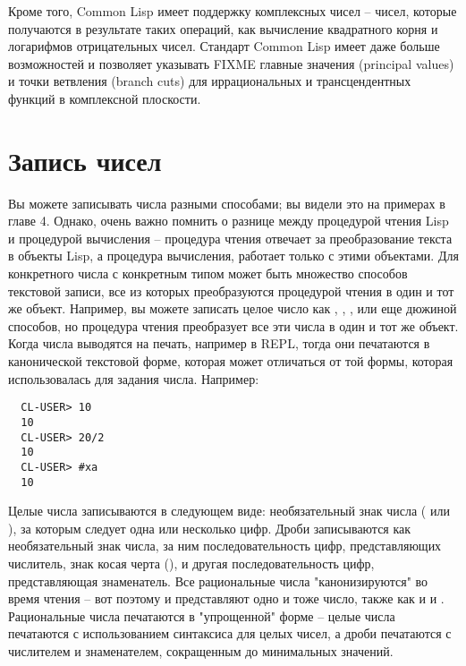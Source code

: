 Кроме того, Common Lisp имеет поддержку комплексных чисел -- чисел, которые получаются в
результате таких операций, как вычисление квадратного корня и логарифмов отрицательных
чисел. Стандарт Common Lisp имеет даже больше возможностей и позволяет указывать FIXME
главные значения (principal values) и точки ветвления (branch cuts) для иррациональных и
трансцендентных функций в комплексной плоскости.

\section{Запись чисел}

Вы можете записывать числа разными способами; вы видели это на примерах в главе 4.
Однако, очень важно помнить о разнице между процедурой чтения Lisp и процедурой вычисления
-- процедура чтения отвечает за преобразование текста в объекты Lisp, а процедура
вычисления, работает только с этими объектами.  Для конкретного числа с конкретным типом
может быть множество способов текстовой записи, все из которых преобразуются процедурой
чтения в один и тот же объект.  Например, вы можете записать целое число  как
, , , или еще дюжиной способов, но процедура чтения
преобразует все эти числа в один и тот же объект.  Когда числа выводятся на печать,
например в REPL, тогда они печатаются в канонической текстовой форме, которая может
отличаться от той формы, которая использовалась для задания числа.  Например:

\begin{verbatim}
  CL-USER> 10
  10
  CL-USER> 20/2
  10
  CL-USER> #xa
  10
\end{verbatim}

Целые числа записываются в следующем виде: необязательный знак числа (\code{+} или
\code{-}), за которым следует одна или несколько цифр.  Дроби записываются как
необязательный знак числа, за ним последовательность цифр, представляющих числитель, знак
косая черта (\code{/}), и другая последовательность цифр, представляющая знаменатель.  Все
рациональные числа "канонизируются" во время чтения -- вот поэтому  и 
представляют одно и тоже число, также как и  и .  Рациональные числа
печатаются в "упрощенной" форме -- целые числа печатаются с использованием синтаксиса для
целых чисел, а дроби печатаются с числителем и знаменателем, сокращенным до минимальных
значений.

